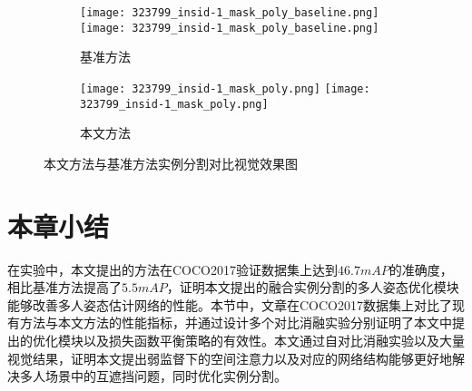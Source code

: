 \begin{figure}[H]
\begin{minipage}{\linewidth}
		\vskip5pt
		\begin{subfigure}[b]{0.45\linewidth}
			\begin{minipage}{\linewidth}
				\centering
				\texttt{[image: 323799\_insid-1\_mask\_poly\_baseline.png]}
				{\texttt{[image: 323799\_insid-1\_mask\_poly\_baseline.png]}}
			\end{minipage}	
			\caption{基准方法\cite{He2017Mask}}
		\end{subfigure}
		\begin{subfigure}[b]{0.45\linewidth}
			\begin{minipage}{\linewidth}
				\centering
				\texttt{[image: 323799\_insid-1\_mask\_poly.png]}
				{\texttt{[image: 323799\_insid-1\_mask\_poly.png]}}
			\end{minipage}	
			\caption{本文方法}
		\end{subfigure}
	\end{minipage}
	\caption{本文方法与基准方法实例分割对比视觉效果图}
	\label{fig:comparison_mask}
\end{figure}


\section{本章小结}
在实验中，本文提出的方法在COCO2017\cite{lin2014microsoft}验证数据集上达到$46.7mAP$的准确度，相比基准方法提高了$5.5mAP$，证明本文提出的融合实例分割的多人姿态优化模块能够改善多人姿态估计网络的性能。本节中，文章在COCO2017数据集上对比了现有方法与本文方法的性能指标，并通过设计多个对比消融实验分别证明了本文中提出的优化模块以及损失函数平衡策略的有效性。本文通过自对比消融实验以及大量视觉结果，证明本文提出弱监督下的空间注意力以及对应的网络结构能够更好地解决多人场景中的互遮挡问题，同时优化实例分割。